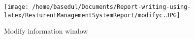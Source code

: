 \documentclass[12pt,a4paper]{article}
\begin{document}
			\begin{figure}[H]
		\centering
		\texttt{[image: /home/basedul/Documents/Report-writing-using-latex/ResturentManagementSystemReport/modifyc.JPG]}
		\caption{\hspace{0.35em}Modify information window}
		\label{fig:madmin} 
%		
%		
%		
%		
		\end{figure}	
						
		

	\begin{comment}
	\subsection{Implementing Extreme Programming (XP)}
	As discussed in section \ref{dev:agile}, this project used an agile methodology called Extreme Programming (XP).
This type of methodology utilises an iterative process involving client communication and feedback.
The iterations were short with a new software version built at the end of each phase. Version control
helped with debugging as the versions could be rolled back to find the iteration that caused the bug.
\subsection{Data Storage and Retrieval}
	As discussed in Section \ref{Rel:RDBMS}, a RDBMS was the preferred storage method chosen for this project. The two
ER diagrams (Figure \ref{fig:entityone} and \ref{fig:entitytwo}) that were designed in Section \ref{sec:entity} helped with the implementation
of the database.\\


\end{comment}
\end{document}
